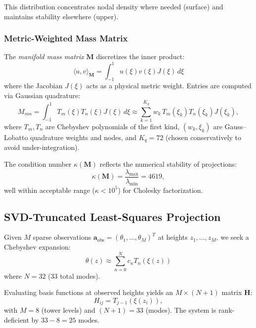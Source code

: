 \documentclass[11pt,a4paper]{article}
\begin{document}
This distribution concentrates nodal density where needed (surface) and maintains stability elsewhere (upper).

\subsubsection{Metric-Weighted Mass Matrix}

The \emph{manifold mass matrix} $\mathbf{M}$ discretizes the inner product:
\begin{equation}
\langle u, v \rangle_{\mathbf{M}} = \int_{-1}^{1} u(\xi) v(\xi) J(\xi) \, d\xi
\label{eq:metric_inner_product}
\end{equation}
where the Jacobian $J(\xi)$ acts as a physical metric weight. Entries are computed via Gaussian quadrature:
\begin{equation}
M_{mn} = \int_{-1}^{1} T_m(\xi) T_n(\xi) J(\xi) \, d\xi \approx \sum_{k=1}^{K_q} w_k \, T_m(\xi_k) T_n(\xi_k) J(\xi_k),
\label{eq:mass_matrix}
\end{equation}
where $T_m, T_n$ are Chebyshev polynomials of the first kind, $(w_k, \xi_k)$ are Gauss--Lobatto quadrature weights and nodes, and $K_q = 72$ (chosen conservatively to avoid under-integration).

The condition number $\kappa(\mathbf{M})$ reflects the numerical stability of projections:
\begin{equation}
\kappa(\mathbf{M}) = \frac{\lambda_{\max}}{\lambda_{\min}} = 4619,
\end{equation}
well within acceptable range ($\kappa < 10^5$) for Cholesky factorization.

\subsection{SVD-Truncated Least-Squares Projection}
\label{sec:methods:svd}

Given $M$ sparse observations $\mathbf{a}_{\mathrm{obs}} = (\theta_1, \ldots, \theta_M)^T$ at heights $z_1, \ldots, z_M$, we seek a Chebyshev expansion:
\begin{equation}
\theta(z) \approx \sum_{n=0}^{N} c_n T_n(\xi(z))
\end{equation}
where $N = 32$ (33 total modes).

Evaluating basis functions at observed heights yields an $M \times (N+1)$ matrix $\mathbf{H}$:
\begin{equation}
H_{ij} = T_{j-1}(\xi(z_i)),
\label{eq:h_matrix}
\end{equation}
with $M = 8$ (tower levels) and $(N+1) = 33$ (modes). The system is rank-deficient by $33 - 8 = 25$ modes.
\end{document}
